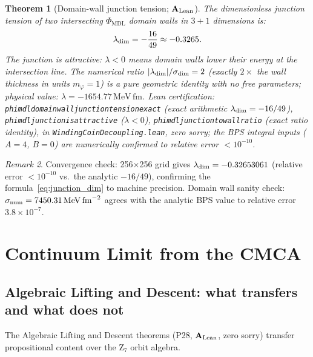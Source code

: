\documentclass[11pt]{article}
\newtheorem{theorem}{Theorem}[section]
\theoremstyle{remark}
\newtheorem{remark}[theorem]{Remark}
\newcommand{\PHIMDL}{\Phi_{\mathrm{MDL}}}
\newcommand{\lean}[1]{%
  \penalty-100
  \begingroup\def\_{\textunderscore\allowbreak}\texttt{#1}\endgroup}
\newcommand{\CatAL}{\ensuremath{\textbf{A}_{\rm Lean}}}
\begin{document}
\begin{theorem}[Domain-wall junction tension; $\CatAL$]
  \label{thm:junction}
  The dimensionless junction tension of two intersecting $\PHIMDL$ domain walls in
  $3+1$ dimensions is:
  \begin{equation}
    \lambda_{\rm dim} = -\frac{16}{49} \approx -0.3265.
  \end{equation}
  The junction is \emph{attractive}: $\lambda < 0$ means domain walls lower their
  energy at the intersection line.  The numerical ratio $|\lambda_{\rm dim}|/\sigma_{\rm dim} = 2$
  (exactly $2\times$ the wall thickness in units $m_\varphi=1$) is a pure geometric
  identity with no free parameters; physical value: $\lambda = -1654.77\,\mathrm{MeV\,fm}$.
  Lean certification:
  \lean{phimdl\_domain\_wall\_junction\_tension\_exact} (exact arithmetic $\lambda_{\rm dim}=-16/49$),
  \lean{phimdl\_junction\_is\_attractive} ($\lambda<0$),
  \lean{phimdl\_junction\_to\_wall\_ratio} (exact ratio identity),
  in \lean{WindingCoinDecoupling.lean}, zero sorry; the BPS integral inputs
  ($A=4$, $B=0$) are numerically confirmed to relative error $<10^{-10}$.
\end{theorem}

\begin{remark}
  Convergence check: 256\nobreakdash$\times$256 grid gives
  $\lambda_{\rm dim} = -0.32653061$ (relative error $< 10^{-10}$ vs.\
  the analytic $-16/49$), confirming the formula~\eqref{eq:junction_dim} to
  machine precision.  Domain wall sanity check: $\sigma_{\rm num} = 7450.31\,\mathrm{MeV\,fm}^{-2}$
  agrees with the analytic BPS value to relative error $3.8\times10^{-7}$.
\end{remark}

\section{Continuum Limit from the CMCA}
\label{sec:continuum}

\subsection{Algebraic Lifting and Descent: what transfers and what does not}
\label{ssec:lifting_descent}

The Algebraic Lifting and Descent theorems (P28, $\CatAL$, zero sorry)
transfer propositional content over the Z$_7$ orbit algebra.
\end{document}
